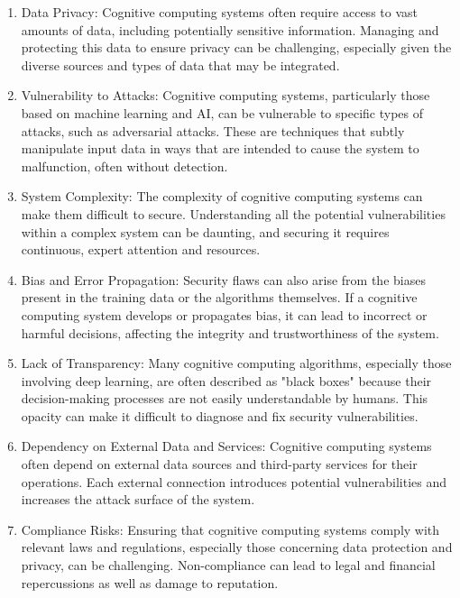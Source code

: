 \documentclass{article}
\begin{document}
\begin{enumerate}
	\item Data Privacy: Cognitive computing systems often require access to vast amounts of data, including potentially sensitive information. Managing and protecting this data to ensure privacy can be challenging, especially given the diverse sources and types of data that may be integrated.

	\item Vulnerability to Attacks: Cognitive computing systems, particularly those based on machine learning and AI, can be vulnerable to specific types of attacks, such as adversarial attacks. These are techniques that subtly manipulate input data in ways that are intended to cause the system to malfunction, often without detection.

	\item System Complexity: The complexity of cognitive computing systems can make them difficult to secure. Understanding all the potential vulnerabilities within a complex system can be daunting, and securing it requires continuous, expert attention and resources.

	\item Bias and Error Propagation: Security flaws can also arise from the biases present in the training data or the algorithms themselves. If a cognitive computing system develops or propagates bias, it can lead to incorrect or harmful decisions, affecting the integrity and trustworthiness of the system.

	\item Lack of Transparency: Many cognitive computing algorithms, especially those involving deep learning, are often described as "black boxes" because their decision-making processes are not easily understandable by humans. This opacity can make it difficult to diagnose and fix security vulnerabilities.

	\item Dependency on External Data and Services: Cognitive computing systems often depend on external data sources and third-party services for their operations. Each external connection introduces potential vulnerabilities and increases the attack surface of the system.

	\item Compliance Risks: Ensuring that cognitive computing systems comply with relevant laws and regulations, especially those concerning data protection and privacy, can be challenging. Non-compliance can lead to legal and financial repercussions as well as damage to reputation.
\end{enumerate}
\end{document}
